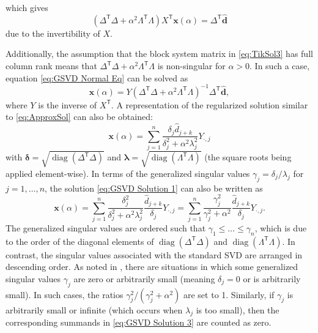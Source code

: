 \documentclass[12pt]{article}
\newcommand{\dVec}{\mathbf{d}}	%
\newcommand{\xVec}{\mathbf{x}}	%
\newcommand{\trans}[1]{{#1}^\mathsf{T}}	%
\newcommand{\inv}[1]{{#1}^{-1}}	%
\DeclareMathOperator{\diag}{diag}	%
\newcommand{\regparam}{\alpha}  %
\newcommand{\svd}[1]{\widehat{#1}}	%
\begin{document}
which gives 
\begin{equation}
    \label{eq:GSVD Normal Eq}
    (\trans{\Delta}\Delta + \regparam^2 \trans{\Lambda}\Lambda)\trans{X}\xVec(\regparam) = \trans{\Delta}\svd{\dVec}
\end{equation}
due to the invertibility of $X$. \par
Additionally, the assumption that the block system matrix in \eqref{eq:TikSol3} has full column rank means that $\trans{\Delta}\Delta + \regparam^2 \trans{\Lambda}\Lambda$ is non-singular for $\regparam > 0$. In such a case, equation \eqref{eq:GSVD Normal Eq} can be solved as
\begin{equation}
    \label{eq:GSVD Normal Eq Sol}
    \xVec(\regparam) = Y\inv{\left(\trans{\Delta}\Delta + \regparam^2 \trans{\Lambda}\Lambda\right)}\trans{\Delta}\svd{\dVec},
\end{equation}
where $Y$ is the inverse of $\trans{X}$. A representation of the regularized solution similar to \eqref{eq:ApproxSol} can also be obtained:
\begin{equation}
\label{eq:GSVD Solution 1}
\xVec(\regparam) = \sum_{j = 1}^{n} \frac{\delta_j \svd{d}_{j+k}}{\delta^2_j + \regparam^2 \lambda^2_j}Y_{\cdot,j}
\end{equation}
with $\bm{\delta} = \sqrt{\diag(\trans{\Delta}\Delta)}$ and $\bm{\lambda} = \sqrt{\diag(\trans{\Lambda}\Lambda)}$ (the square roots being applied element-wise).  In terms of the generalized singular values $\gamma_j = \delta_j/\lambda_j$ for $j = 1,\ldots,n$, the solution \eqref{eq:GSVD Solution 1} can also be written as
\begin{equation}
\label{eq:GSVD Solution 3}
\xVec(\regparam) = \sum_{j = 1}^{n} \frac{\delta_j^2}{\delta^2_j + \regparam^2 \lambda^2_j} \frac{\svd{d}_{j+k}}{\delta_j} Y_{\cdot,j} = \sum_{j = 1}^{n} \frac{\gamma_j^2}{\gamma^2_j + \regparam^2} \frac{\svd{d}_{j+k}}{\delta_j} Y_{\cdot,j}.
\end{equation}
The generalized singular values are ordered such that $\gamma_1 \leq \ldots \leq \gamma_n$, which is due to the order of the diagonal elements of $\diag(\trans{\Delta}\Delta)$ and $\diag(\trans{\Lambda}\Lambda)$. In contrast, the singular values associated with the standard SVD are arranged in descending order. As noted in \cite[p.~107]{ABT}, there are situations in which some generalized singular values $\gamma_j$ are zero or arbitrarily small (meaning $\delta_j = 0$ or is arbitrarily small). In such cases, the ratios $\gamma_j^2/(\gamma_j^2 + \regparam^2)$ are set to 1. Similarly, if $\gamma_j$ is arbitrarily small or infinite (which occurs when $\lambda_j$ is too small), then the corresponding summands in \eqref{eq:GSVD Solution 3} are counted as zero. \par
\end{document}
